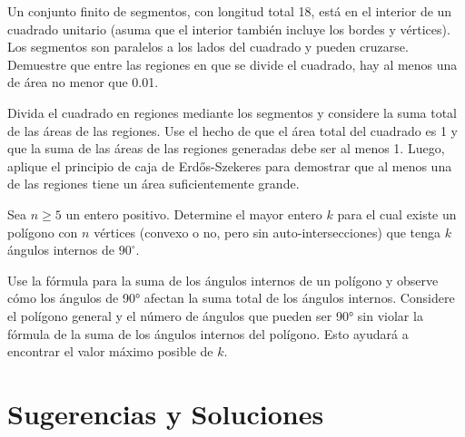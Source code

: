 \documentclass[11pt]{scrartcl}
\begin{document}
\begin{problem}
Un conjunto finito de segmentos, con longitud total 18, está en el interior de un cuadrado unitario (asuma que el interior también incluye los bordes y vértices). Los segmentos son paralelos a los lados del cuadrado y pueden cruzarse. Demuestre que entre las regiones en que se divide el cuadrado, hay al menos una de área no menor que 0.01.
    \begin{hint}
    Divida el cuadrado en regiones mediante los segmentos y considere la suma total de las áreas de las regiones. Use el hecho de que el área total del cuadrado es 1 y que la suma de las áreas de las regiones generadas debe ser al menos 1. Luego, aplique el principio de caja de Erdős-Szekeres para demostrar que al menos una de las regiones tiene un área suficientemente grande.
    \end{hint}
\end{problem}

\begin{problem}
Sea \( n \geq 5 \) un entero positivo. Determine el mayor entero \( k \) para el cual existe un polígono con \( n \) vértices (convexo o no, pero sin auto-intersecciones) que tenga \( k \) ángulos internos de \( 90^\circ \).
    \begin{hint}
    Use la fórmula para la suma de los ángulos internos de un polígono y observe cómo los ángulos de 90° afectan la suma total de los ángulos internos. Considere el polígono general y el número de ángulos que pueden ser 90° sin violar la fórmula de la suma de los ángulos internos del polígono. Esto ayudará a encontrar el valor máximo posible de \( k \).
    \end{hint}
\end{problem}


\section{Sugerencias y Soluciones}
\begin{enumerate}

\end{enumerate}
\end{document}
